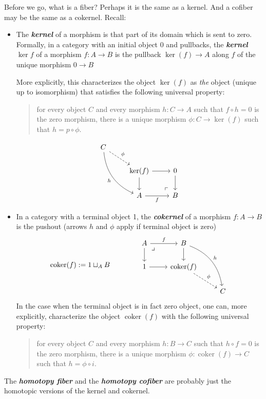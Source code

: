 Before we go, what is a fiber? Perhaps it is the same as a kernel. And a cofiber may be the same as a cokernel. Recall:
\begin{defn}\leavevmode 
	\begin{itemize}
		\item The \textbf{\textit{kernel}} of a morphism is that part of its domain which is sent to zero. Formally, in a category with an initial object 0 and pullbacks, the \textbf{\textit{kernel $\operatorname{ker} f$}} of a morphism $f:A\to B$ is the pullback $\operatorname{ker}(f)\to A$ along $f$ of the unique morphism $0\to B$
		
		More explicitly, this characterizes the object $\operatorname{ker}(f)$ as \textit{the} object (unique up to isomorphism) that satisfies the following universal property:
		\begin{quote}
			for every object $C$ and every morphism $h:C\to A$ such that $f\circ h=0$ is the zero morphism, there is a unique morphism $\phi:C\to\operatorname{ker}(f)$ such that $h=p\circ\phi$.
		\end{quote}
		\[\begin{tikzcd}
			C\arrow[dr,dashed,"\phi"]\arrow[ddr,bend right,swap,"h"]\\
			&\operatorname{ker}(f)\arrow[d]\arrow[r]&0\arrow[d]\\
			&A\arrow[r,"f",swap]&B\arrow[ul, phantom, "\ulcorner", very near start]
		\end{tikzcd}\]
		\item In a category with a terminal object 1, the \textbf{\textit{cokernel}} of a morphism $f:A\to B$ is the pushout (arrows $h$ and $\phi$ apply if terminal object is zero)
		\[\operatorname{coker}(f):=1\sqcup_AB\qquad\qquad\begin{tikzcd}
			A\arrow[r,"f"]\arrow[d]\arrow[dr, phantom, "\lrcorner", very near start]&B\arrow[d]\arrow[rdd,bend left,"h"]\\
			1\arrow[r]&\operatorname{coker}(f)\arrow[dr,dashed,"\phi"]\\
			&&C
		\end{tikzcd}\]
		In the case when the terminal object is in fact zero object, one can, more explicitly, characterize the object $\operatorname{coker}(f)$ with the following universal property:
		\begin{quote}
			for every object $C$ and every morphism $h:B\to C$ such that $h\circ f=0$ is the zero morphism, there is a unique morphism $\phi:\operatorname{coker}(f)\to C$ such that $h=\phi\circ i$.
		\end{quote}
\end{itemize}
\end{defn}
{\color{magenta}The \textit{\textbf{homotopy fiber}} and the  \textit{\textbf{homotopy cofiber}} are probably just the homotopic versions of the kernel and cokernel.}


